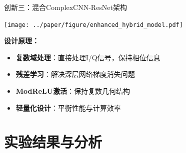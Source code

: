 \documentclass[aspectratio=169]{beamer}
\begin{document}
\begin{frame}{创新三：混合ComplexCNN-ResNet架构}
\begin{center}
\texttt{[image: ../paper/figure/enhanced\_hybrid\_model.pdf]}
\end{center}

\textbf{设计原理：}
\begin{itemize}
\item \textbf{复数域处理}：直接处理I/Q信号，保持相位信息
\item \textbf{残差学习}：解决深层网络梯度消失问题
\item \textbf{ModReLU激活}：保持复数几何结构
\item \textbf{轻量化设计}：平衡性能与计算效率
\end{itemize}

\end{frame}

\section{实验结果与分析}
\end{document}
